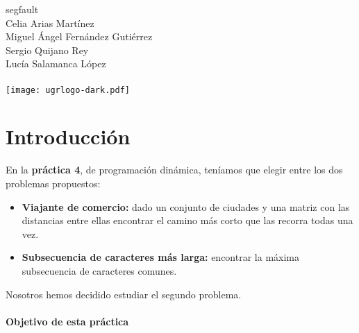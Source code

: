 \documentclass[10pt, a4paper]{article}
\theoremstyle{theorem-style}
\theoremstyle{theorem-style}
\theoremstyle{definition-style}
\theoremstyle{remark-style}
\theoremstyle{example-style}
\theoremstyle{definition-style}
\theoremstyle{remark-style}
\newcommand{\autor}{Celia Arias Martínez\\Miguel Ángel Fernández Gutiérrez\\Sergio Quijano Rey\\Lucía Salamanca López\\\hspace{1cm}}
\newcommand{\grado}{segfault}
\begin{document}
\begin{titlepage}

  \parbox[t]{\textwidth}{
  	\raggedright %
  	\fontsize{40pt}{40pt}\selectfont\sffamily{}
  }

	\vfill
	
	\parbox[t]{\textwidth}{
		\raggedright %
		\sffamily\large
		\grado\\
		{\Large \autor }\\[15pt]
		\texttt{[image: ugrlogo-dark.pdf]}
	}

\end{titlepage}


\thispagestyle{empty}
\tableofcontents
\newpage


\part{Introducción}

En la \textbf{práctica 4}, de programación dinámica, teníamos que elegir entre los dos problemas propuestos: 

\begin{itemize}
	\item \textbf{Viajante de comercio:} dado un conjunto de ciudades y una matriz con las distancias entre ellas encontrar el camino más corto que las recorra todas una vez.
	\item \textbf{Subsecuencia de caracteres más larga:} encontrar la máxima subsecuencia de caracteres comunes.  
\end{itemize}
Nosotros hemos decidido estudiar el segundo problema.

\subsection*{Objetivo de esta práctica}
\end{document}
